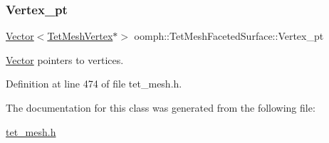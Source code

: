 \subsubsection{\texorpdfstring{Vertex\+\_\+pt}{Vertex\_pt}}
{\footnotesize\ttfamily \hyperlink{classoomph_1_1Vector}{Vector}$<$\hyperlink{classoomph_1_1TetMeshVertex}{Tet\+Mesh\+Vertex}$\ast$$>$ oomph\+::\+Tet\+Mesh\+Faceted\+Surface\+::\+Vertex\+\_\+pt\hspace{0.3cm}{\ttfamily [protected]}}



\hyperlink{classoomph_1_1Vector}{Vector} pointers to vertices. 



Definition at line 474 of file tet\+\_\+mesh.\+h.



The documentation for this class was generated from the following file\+:\begin{DoxyCompactItemize}
\item 
\hyperlink{tet__mesh_8h}{tet\+\_\+mesh.\+h}\end{DoxyCompactItemize}

